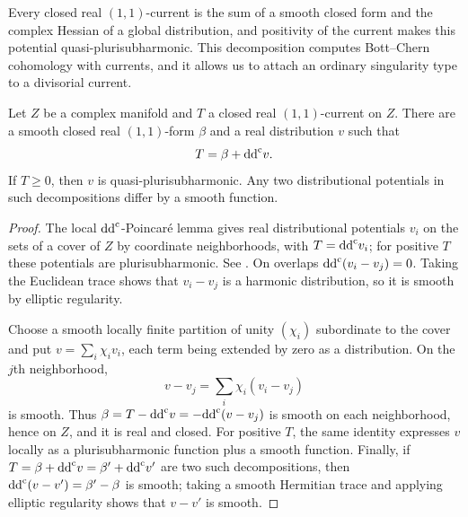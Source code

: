 Every closed real $(1,1)$-current is the sum of a smooth closed form and the complex Hessian of a global distribution, and positivity of the current makes this potential quasi-plurisubharmonic. This decomposition computes Bott--Chern cohomology with currents, and it allows us to attach an ordinary singularity type to a divisorial current.

\begin{lemma}\label{lem:closed-current-global-potential}
Let $Z$ be a complex manifold and $T$ a closed real $(1,1)$-current on $Z$. There are a smooth closed real $(1,1)$-form $\beta$ and a real distribution $v$ such that
\[
 T=\beta+\mathrm{dd}^{\mathrm{c}} v.
\]
If $T\geq0$, then $v$ is quasi-plurisubharmonic. Any two distributional potentials in such decompositions differ by a smooth function.
\end{lemma}
\begin{proof}
The local $\mathrm{dd}^{\mathrm{c}}$-Poincar\'e lemma gives real distributional potentials $v_i$ on the sets of a cover of $Z$ by coordinate neighborhoods, with $T=\mathrm{dd}^{\mathrm{c}} v_i$; for positive $T$ these potentials are plurisubharmonic. See \cite[Chapter III, Section 1.18 and Proposition 1.19]{DemCADG}. On overlaps $\mathrm{dd}^{\mathrm{c}}(v_i-v_j)=0$. Taking the Euclidean trace shows that $v_i-v_j$ is a harmonic distribution, so it is smooth by elliptic regularity.

Choose a smooth locally finite partition of unity $(\chi_i)$ subordinate to the cover and put $v=\sum_i\chi_i v_i$, each term being extended by zero as a distribution. On the $j$th neighborhood,
\[
 v-v_j=\sum_i\chi_i(v_i-v_j)
\]
is smooth. Thus $\beta=T-\mathrm{dd}^{\mathrm{c}} v=-\mathrm{dd}^{\mathrm{c}}(v-v_j)$ is smooth on each neighborhood, hence on $Z$, and it is real and closed. For positive $T$, the same identity expresses $v$ locally as a plurisubharmonic function plus a smooth function. Finally, if $T=\beta+\mathrm{dd}^{\mathrm{c}} v=\beta'+\mathrm{dd}^{\mathrm{c}} v'$ are two such decompositions, then $\mathrm{dd}^{\mathrm{c}}(v-v')=\beta'-\beta$ is smooth; taking a smooth Hermitian trace and applying elliptic regularity shows that $v-v'$ is smooth.
\end{proof}

